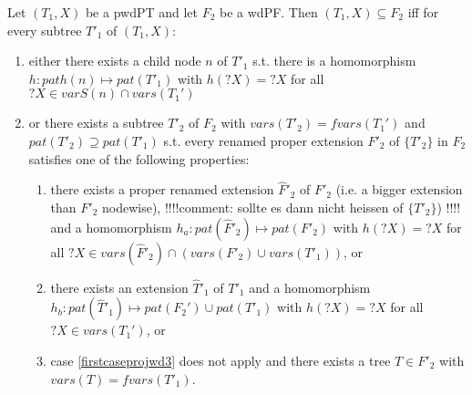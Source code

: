 \begin{theorem}\label{projwd3}
	Let $(T_1,X)$ be a pwdPT and let $F_2$ be a wdPF. Then $(T_1,X) \subseteq
	F_2$ iff for every subtree $T'_1$ of $(T_1,X)$:
	\begin{enumerate}
		\item either there exists a child node $n$ of $T'_1$ s.t. there is a
			homomorphism $h: path(n) \mapsto pat(T'_1)$ with $h(?X) = ?X$ for
			all $?X \in varS(n) \cap vars(T_1')$
		\item or there exists a subtree $T'_2$ of $F_2$ with $vars(T'_2) =
			fvars(T_1')$ and $pat(T'_2) \supseteq pat(T'_1)$ s.t. every
			renamed proper extension $F'_2$ of $\{T'_2\}$ in $F_2$ satisfies one
			of the following properties:
			\begin{enumerate}
				\item \label{firstcaseprojwd3}there exists a proper renamed extension $\hat{F}'_2$ of
					$F'_2$ (i.e. a bigger extension than $F'_2$ nodewise),
			!!!!comment: sollte es dann nicht heissen of $\{T'_2\}$) !!!!
					and a homomorphism $h_a: pat(\hat{F}'_2) \mapsto
					pat(F'_2)$ with $h(?X) = ?X$ for all $?X \in
					vars(\hat{F}'_2)\cap (vars(F'_2) \cup vars(T'_1))$, or
				\item there exists an extension $\hat{T}'_1$ of $T'_1$ and a
					homomorphism $h_b: pat(\hat{T}'_1) \mapsto pat(F_2') \cup
					pat(T'_1)$ with $h(?X) =?X$ for all $?X \in vars(T_1')$, or
				\item case \ref{firstcaseprojwd3} does not apply and there
					exists a tree $T \in F'_2$ with $vars(T)= fvars(T'_1)$.
			\end{enumerate}
	\end{enumerate}
\end{theorem}
